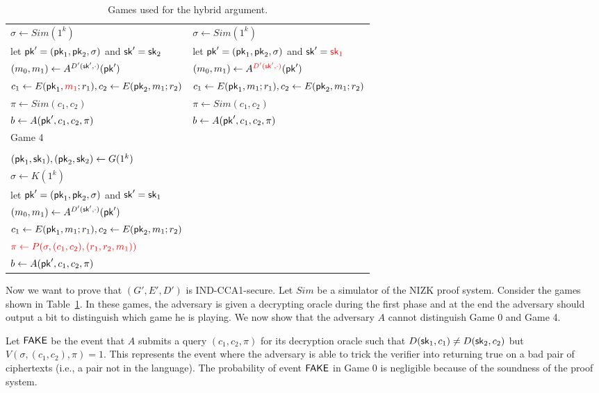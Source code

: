 \begin{table}[t!]
\begin{tabular}{l|l}
$\sigma \leftarrow {Sim(1^k)}$ &
$\sigma \leftarrow {Sim(1^k)}$ \\
let $\mathsf{pk}'=(\mathsf{pk}_1,\mathsf{pk}_2,\sigma)$ and $\mathsf{sk}'={\mathsf{sk}_2}$  &
let $\mathsf{pk}'=(\mathsf{pk}_1,\mathsf{pk}_2,\sigma)$ and $\mathsf{sk}'=\textcolor{red}{\mathsf{sk}_1}$  \\
$(m_0,m_1) \leftarrow A^{D'(\mathsf{sk}',\cdot)}(\mathsf{pk}')$ &
$(m_0,m_1) \leftarrow A^{\textcolor{red}{D'(\mathsf{sk}',\cdot)}}(\mathsf{pk}')$ \\
$c_1 \leftarrow E(\mathsf{pk}_1,\textcolor{red}{m_1};r_1), c_2 \leftarrow E(\mathsf{pk}_2,{m_1};r_2)$ &
$c_1 \leftarrow E(\mathsf{pk}_1,{m_1};r_1), c_2 \leftarrow E(\mathsf{pk}_2,{m_1};r_2)$ \\
$\pi \leftarrow {Sim(c_1,c_2)}$ &
$\pi \leftarrow {Sim(c_1,c_2)}$ \\
$b \leftarrow A(\mathsf{pk}',c_1,c_2,\pi)$ &
$b \leftarrow A(\mathsf{pk}',c_1,c_2,\pi)$ \\
\hline
Game 4 & \\
 & \\
$(\mathsf{pk}_1,\mathsf{sk}_1),(\mathsf{pk}_2,\mathsf{sk}_2) \leftarrow G(1^k)$ & \\
$\sigma \leftarrow {K(1^k)}$ & \\
let $\mathsf{pk}'=(\mathsf{pk}_1,\mathsf{pk}_2,\sigma)$ and $\mathsf{sk}'={\mathsf{sk}_1}$  & \\
$(m_0,m_1) \leftarrow A^{D'(\mathsf{sk}',\cdot)}(\mathsf{pk}')$ & \\
$c_1 \leftarrow E(\mathsf{pk}_1,{m_1};r_1), c_2 \leftarrow E(\mathsf{pk}_2,{m_1};r_2)$ & \\
$\textcolor{red}{\pi \leftarrow {P(\sigma,(c_1,c_2),(r_1,r_2,{m_1}))}}$ & \\
$b \leftarrow A(\mathsf{pk}',c_1,c_2,\pi)$ & \\
\end{tabular}
\caption{Games used for the hybrid argument.}\label{tab:games}
\end{table}

Now we want to prove that $(G',E',D')$ is IND-CCA1-secure.
Let $Sim$ be a simulator of the NIZK proof system.
Consider the games shown in Table~\ref{tab:games}.
In these games, the adversary is given a decrypting oracle during the first phase
and at the end the adversary should output a bit to distinguish which game he is playing.
We now show that the adversary $A$ cannot distinguish Game 0 and Game 4.

Let $\mathsf{FAKE}$  be the event that $A$ submits a query $(c_1,c_2,\pi)$ for its decryption oracle such that $D(\mathsf{sk}_1,c_1) \neq D(\mathsf{sk}_2, c_2)$ but $V(\sigma,(c_1,c_2),\pi)=1$.
This represents the event where the adversary is able to trick the verifier into returning true on a bad pair of ciphertexts (i.e., a pair not in the language).
The probability of event $\mathsf{FAKE}$ in Game 0 is negligible because of the
soundness of the proof system.

